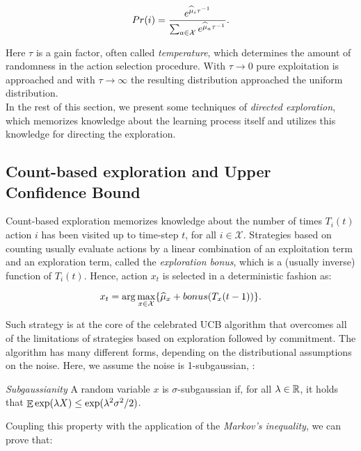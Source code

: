 \begin{equation}
Pr(i) = \frac{e^{\widehat{\mu}_i \tau^{-1}}}{\sum_{a\in\mathcal{X}}e^{\widehat{\mu}_{a}\tau^{-1}}}.
\end{equation}

Here $\tau$ is a gain factor, often called \emph{temperature}, which determines the amount of randomness in the action selection procedure. With $\tau\to 0$ pure exploitation is approached and with $\tau\to \infty$ the resulting distribution approached the uniform distribution. \\
In the rest of this section, we present some techniques of \emph{directed exploration}, which memorizes knowledge about the learning process itself and utilizes this knowledge for directing the exploration.

\subsection{Count-based exploration and Upper Confidence Bound}
Count-based exploration memorizes knowledge about the number of times $T_i(t)$ action $i$ has been visited up to time-step $t$, for all $i\in\mathcal{X}$. Strategies based on counting usually evaluate actions by a linear combination of an exploitation term and an exploration term, called the \emph{exploration bonus}, which is a (usually inverse) function of $T_i(t)$. Hence, action $x_t$ is selected in a deterministic fashion as:

\begin{equation}
x_t = \arg\max_{x\in\mathcal{X}}\{\widehat{\mu}_x + bonus(T_x(t-1))\}.
\end{equation}

Such strategy is at the core of the celebrated \gls{UCB} algorithm \cite{lai1985asymptotically, agrawal1995continuum, auer2002finite} that overcomes all of the limitations of strategies based on exploration followed by commitment. The algorithm has many different forms, depending on the distributional assumptions on the noise. Here, we assume the noise is 1-subgaussian, \ie :

\begin{definition} \label{def:subgaussianity}
\emph{Subgaussianity} A random variable $x$ is $\sigma$-subgaussian if, for all $\lambda\in\mathbb{R}$, it holds that $\mathop{\mathbb{E}}{\exp(\lambda X})\leq\exp(\lambda^2\sigma^2/2)$.
\end{definition}

Coupling this property with the application of the \emph{Markov's inequality}, we can prove that:

